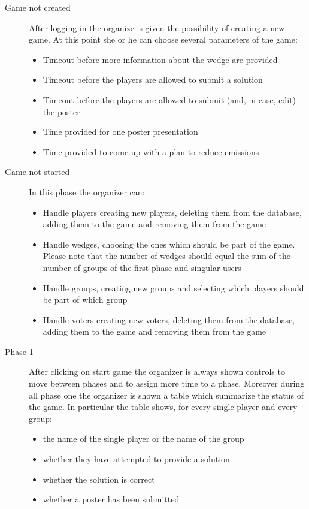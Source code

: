 \begin{description}
	\item[Game not created] After logging in the organize is given the possibility of creating a new game. At this point she or he can choose several parameters of the game:
		\begin{itemize}
		\item Timeout before more information about the wedge are provided
		\item Timeout before the players are allowed to submit a solution
		\item Timeout before the players are allowed to submit (and, in case, edit) the poster
		\item Time provided for one poster presentation
		\item Time provided to come up with a plan to reduce emissions
		\end{itemize}
	\item[Game not started] In this phase the organizer can:
		\begin{itemize}
		\item Handle players creating new players, deleting them from the database, adding them to the game and removing them from the game
		\item Handle wedges, choosing the ones which should be part of the game. Please note that the number of wedges should equal the sum of the number of groups of the first phase and singular users
		\item Handle groups, creating new groups and selecting which players should be part of which group
		\item Handle voters creating new voters, deleting them from the database, adding them to the game and removing them from the game
		\end{itemize}	
	\item[Phase 1] After clicking on start game the organizer is always shown controls to move between phases and to assign more time to a phase. Moreover during all phase one the organizer is shown a table which summarize the status of the game. In particular the table shows, for every single player and every group:
	\begin{itemize}
		\item the name of the single player or the name of the group
		\item whether they have attempted to provide a solution
		\item whether the solution is correct
		\item whether a poster has been submitted

\end{itemize}
\end{description}
